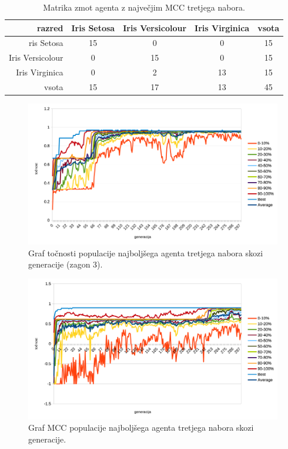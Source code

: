 \begin{table}[H]
    \centering
    \caption{Matrika zmot agenta z največjim MCC tretjega nabora.}
    \begin{tabular}{||rcccc||}
        \hline
        razred           & Iris Setosa & Iris Versicolour & Iris Virginica & vsota \\ \hline
        ris Setosa       & 15          & 0                & 0              & 15    \\ \hline
        Iris Versicolour & 0           & 15               & 0              & 15    \\ \hline
        Iris Virginica   & 0           & 2                & 13             & 15    \\ \hline
        vsota            & 15          & 17               & 13             & 45    \\ \hline
    \end{tabular}
    \label{tab:iris_mcc_3}
\end{table}

\begin{figure}[H]
    \begin{center}
        \includegraphics[width=13cm]{iris/3/acc}
    \end{center}
    \caption{Graf točnosti populacije najboljšega agenta tretjega nabora skozi generacije (zagon 3).}
    \label{fig:iris_acc_3}
\end{figure}

\begin{figure}[H]
    \begin{center}
        \includegraphics[width=13cm]{iris/3/mcc}
    \end{center}
    \caption{Graf MCC populacije najboljšega agenta tretjega nabora skozi generacije.}
    \label{fig:iris_mcc_3}
\end{figure}

